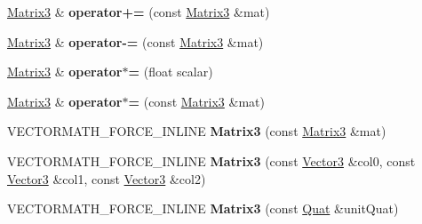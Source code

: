 \begin{DoxyCompactItemize}
\item 
\mbox{\label{classVectormath_1_1Aos_1_1Matrix3_acfb719d8f68c61c56ab7b84770582a4e}} 
\hyperlink{classVectormath_1_1Aos_1_1Matrix3}{Matrix3} \& {\bfseries operator+=} (const \hyperlink{classVectormath_1_1Aos_1_1Matrix3}{Matrix3} \&mat)
\item 
\mbox{\label{classVectormath_1_1Aos_1_1Matrix3_a7578b101b6e10dfe6636eb7f18dfc815}} 
\hyperlink{classVectormath_1_1Aos_1_1Matrix3}{Matrix3} \& {\bfseries operator-\/=} (const \hyperlink{classVectormath_1_1Aos_1_1Matrix3}{Matrix3} \&mat)
\item 
\mbox{\label{classVectormath_1_1Aos_1_1Matrix3_a17e33a77a377918fbe189c6dd192dd56}} 
\hyperlink{classVectormath_1_1Aos_1_1Matrix3}{Matrix3} \& {\bfseries operator$\ast$=} (float scalar)
\item 
\mbox{\label{classVectormath_1_1Aos_1_1Matrix3_ac41072ce7f3bf177037085ff23671b55}} 
\hyperlink{classVectormath_1_1Aos_1_1Matrix3}{Matrix3} \& {\bfseries operator$\ast$=} (const \hyperlink{classVectormath_1_1Aos_1_1Matrix3}{Matrix3} \&mat)
\item 
\mbox{\label{classVectormath_1_1Aos_1_1Matrix3_a70ed1efea22260aaf3feb09bfdae1cd1}} 
V\+E\+C\+T\+O\+R\+M\+A\+T\+H\+\_\+\+F\+O\+R\+C\+E\+\_\+\+I\+N\+L\+I\+NE {\bfseries Matrix3} (const \hyperlink{classVectormath_1_1Aos_1_1Matrix3}{Matrix3} \&mat)
\item 
\mbox{\label{classVectormath_1_1Aos_1_1Matrix3_ae2f8a0046818a2cd2d2c4be443e73cb1}} 
V\+E\+C\+T\+O\+R\+M\+A\+T\+H\+\_\+\+F\+O\+R\+C\+E\+\_\+\+I\+N\+L\+I\+NE {\bfseries Matrix3} (const \hyperlink{classVectormath_1_1Aos_1_1Vector3}{Vector3} \&col0, const \hyperlink{classVectormath_1_1Aos_1_1Vector3}{Vector3} \&col1, const \hyperlink{classVectormath_1_1Aos_1_1Vector3}{Vector3} \&col2)
\item 
\mbox{\label{classVectormath_1_1Aos_1_1Matrix3_adc65495cc7d3528f539437ff760aee77}} 
V\+E\+C\+T\+O\+R\+M\+A\+T\+H\+\_\+\+F\+O\+R\+C\+E\+\_\+\+I\+N\+L\+I\+NE {\bfseries Matrix3} (const \hyperlink{classVectormath_1_1Aos_1_1Quat}{Quat} \&unit\+Quat)

\end{DoxyCompactItemize}
